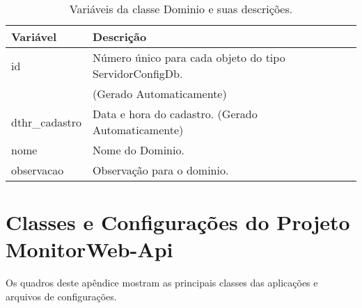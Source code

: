\begin{table}[!ht]
\centering
\begin{tabular}{|l|l|}
\hline
{\color[HTML]{000000} \textbf{Variável}} & {\color[HTML]{000000} \textbf{Descrição}}                                        \\ \hline
id                                       & Número único para cada objeto do tipo ServidorConfigDb.\\
																				 & (Gerado Automaticamente) \\ \hline
dthr\_cadastro                           & Data e hora do cadastro. (Gerado Automaticamente)                                \\ \hline
nome                                     & Nome do Dominio.                                                                 \\ \hline
observacao                               & Observação para o dominio.                                                       \\ \hline
\end{tabular}
\caption[Variáveis da classe Dominio e suas descrições.]{Variáveis da classe Dominio e suas descrições.}
\label{Tab:VariaveisDominio}
\end{table}



\chapter{Classes e Configurações do Projeto MonitorWeb-Api} \label{App:ApendiceB}

Os quadros deste apêndice mostram as principais classes das aplicações e arquivos de configurações.

